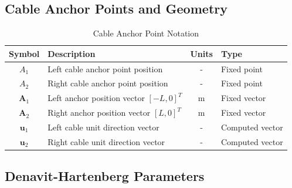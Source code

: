 \subsection{Cable Anchor Points and Geometry}

\begin{table}[h!]
\centering
\caption{Cable Anchor Point Notation}
\begin{tabular}{|c|l|c|l|}
\hline
\textbf{Symbol} & \textbf{Description} & \textbf{Units} & \textbf{Type} \\
\hline
$A_1$ & Left cable anchor point position & - & Fixed point \\
$A_2$ & Right cable anchor point position & - & Fixed point \\
$\bm{A}_1$ & Left anchor position vector $[-L, 0]^T$ & m & Fixed vector \\
$\bm{A}_2$ & Right anchor position vector $[L, 0]^T$ & m & Fixed vector \\
$\bm{u}_1$ & Left cable unit direction vector & - & Computed vector \\
$\bm{u}_2$ & Right cable unit direction vector & - & Computed vector \\
\hline
\end{tabular}
\end{table}

\subsection{Denavit-Hartenberg Parameters}

